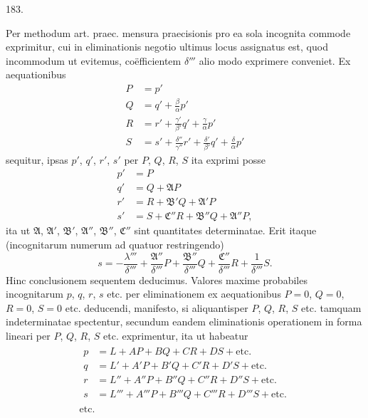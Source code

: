 \begin{center}\hypertarget{native-256-article183}{}183.\end{center}
Per methodum art. praec. mensura praecisionis pro ea sola incognita commode
exprimitur, cui in eliminationis negotio ultimus locus assignatus est,
quod incommodum ut evitemus, coëfficientem $\delta'''$ alio modo exprimere
conveniet. Ex aequationibus
\[
\begin{aligned}
P&=p'\\
Q&=q'+\frac{\beta}{\alpha}p'\\
R&=r'+\frac{\gamma'}{\beta'}q'+\frac{\gamma}{\alpha}p'\\
S&=s'+\frac{\delta''}{\gamma''}r'+\frac{\delta'}{\beta'}q'+\frac{\delta}{\alpha}p'
\end{aligned}
\]
sequitur, ipsas $p'$, $q'$, $r'$, $s'$ per $P$, $Q$, $R$, $S$ ita exprimi posse
\[
\begin{aligned}
p'&=P\\
q'&=Q+\mathfrak{A}P\\
r'&=R+\mathfrak{B}'Q+\mathfrak{A}'P\\
s'&=S+\mathfrak{C}''R+\mathfrak{B}''Q+\mathfrak{A}''P,
\end{aligned}
\]
ita ut $\mathfrak{A}$, $\mathfrak{A}'$, $\mathfrak{B}'$, $\mathfrak{A}''$,
$\mathfrak{B}''$, $\mathfrak{C}''$ sint quantitates determinatae. Erit itaque
(incognitarum numerum ad quatuor restringendo)
\[
s=-\frac{\lambda'''}{\delta'''}+\frac{\mathfrak{A}''}{\delta'''}P
+\frac{\mathfrak{B}''}{\delta'''}Q+\frac{\mathfrak{C}''}{\delta'''}R
+\frac{1}{\delta'''}S.
\]
Hinc conclusionem sequentem deducimus. Valores maxime probabiles incognitarum
$p$, $q$, $r$, $s$ etc. per eliminationem ex aequationibus $P=0$, $Q=0$,
$R=0$, $S=0$ etc. deducendi, manifesto, si aliquantisper $P$, $Q$, $R$, $S$
etc. tamquam indeterminatae spectentur, secundum eandem eliminationis
operationem in forma lineari per $P$, $Q$, $R$, $S$ etc. exprimentur,
ita ut habeatur
\[
\begin{gathered}
\begin{aligned}
p&=L+AP+BQ+CR+DS+\text{etc.}\\
q&=L'+A'P+B'Q+C'R+D'S+\text{etc.}\\
r&=L''+A''P+B''Q+C''R+D''S+\text{etc.}\\
s&=L'''+A'''P+B'''Q+C'''R+D'''S+\text{etc.}
\end{aligned}\\
\text{etc.}
\end{gathered}
\]
